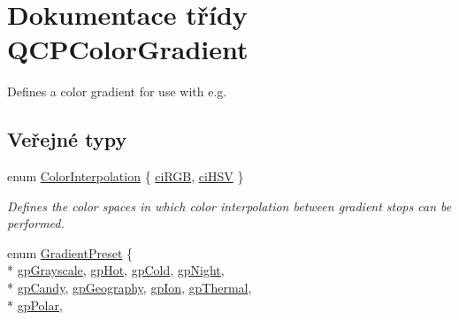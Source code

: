 \hypertarget{classQCPColorGradient}{}\section{Dokumentace třídy Q\+C\+P\+Color\+Gradient}
\label{classQCPColorGradient}


Defines a color gradient for use with e.\+g.  


\subsection*{Veřejné typy}
\begin{DoxyCompactItemize}
\item 
enum \hyperlink{classQCPColorGradient_ac5dca17cc24336e6ca176610e7f77fc1}{Color\+Interpolation} \{ \hyperlink{classQCPColorGradient_ac5dca17cc24336e6ca176610e7f77fc1a5e30f725c9cfe93999e268a9f92afbe7}{ci\+R\+G\+B}, 
\hyperlink{classQCPColorGradient_ac5dca17cc24336e6ca176610e7f77fc1af14ae62fcae11ecc07234eeaec5856cb}{ci\+H\+S\+V}
 \}\begin{DoxyCompactList}\small\item\em Defines the color spaces in which color interpolation between gradient stops can be performed. \end{DoxyCompactList}
\item 
enum \hyperlink{classQCPColorGradient_aed6569828fee337023670272910c9072}{Gradient\+Preset} \{ \\*
\hyperlink{classQCPColorGradient_aed6569828fee337023670272910c9072add11ae369a86f3b1b6205ec72e5021fb}{gp\+Grayscale}, 
\hyperlink{classQCPColorGradient_aed6569828fee337023670272910c9072a4f42e534cf6cff5a29a5388094d099b5}{gp\+Hot}, 
\hyperlink{classQCPColorGradient_aed6569828fee337023670272910c9072aec8c001f62c0d5cb853db5fd85309557}{gp\+Cold}, 
\hyperlink{classQCPColorGradient_aed6569828fee337023670272910c9072a1bb89351b6def7d220973443fe059c62}{gp\+Night}, 
\\*
\hyperlink{classQCPColorGradient_aed6569828fee337023670272910c9072a9e72663bf6b94b65945f7843f24e0721}{gp\+Candy}, 
\hyperlink{classQCPColorGradient_aed6569828fee337023670272910c9072a382f0b07cec1a59d8a533438aea815d2}{gp\+Geography}, 
\hyperlink{classQCPColorGradient_aed6569828fee337023670272910c9072a4297f4f9e212a819cd65e8e34567182b}{gp\+Ion}, 
\hyperlink{classQCPColorGradient_aed6569828fee337023670272910c9072af1676b129f9f458ace453f280c731cf7}{gp\+Thermal}, 
\\*
\hyperlink{classQCPColorGradient_aed6569828fee337023670272910c9072ab7414ce4e36dc3e82e0132a7f0f41b52}{gp\+Polar}, 

\end{DoxyCompactItemize}
